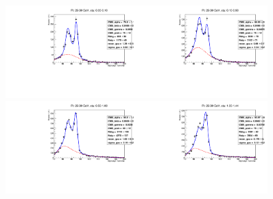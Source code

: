 \begin{figure}[htb]
  \begin{center}
   \includegraphics[width=0.45\textwidth]{../figs/figs_v11/ELECTRON_WGamma/EtoGammaFits/sa_hZmass_h_Data_EtoGamma_Enr_BARREL_pt25to30_ieta0_noWMtCut.pdf}\includegraphics[width=0.45\textwidth]{../figs/figs_v11/ELECTRON_WGamma/EtoGammaFits/sa_hZmass_h_Data_EtoGamma_Enr_BARREL_pt25to30_ieta1_noWMtCut.pdf}\\
   \includegraphics[width=0.45\textwidth]{../figs/figs_v11/ELECTRON_WGamma/EtoGammaFits/sa_hZmass_h_Data_EtoGamma_Enr_BARREL_pt25to30_ieta2_noWMtCut.pdf}\includegraphics[width=0.45\textwidth]{../figs/figs_v11/ELECTRON_WGamma/EtoGammaFits/sa_hZmass_h_Data_EtoGamma_Enr_BARREL_pt25to30_ieta3_noWMtCut.pdf}\\

\end{center}
\end{figure}
